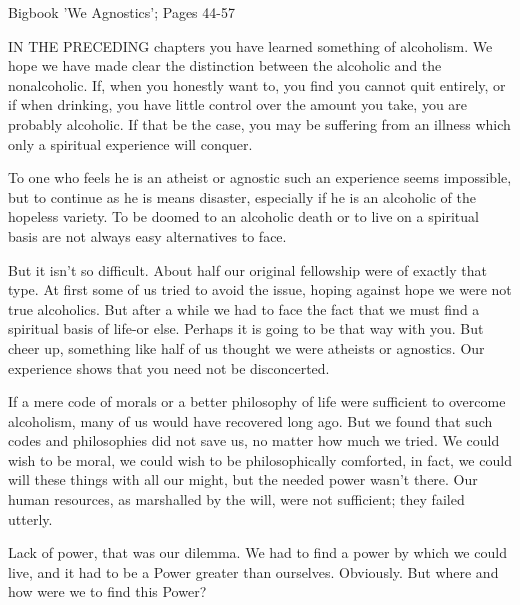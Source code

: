 

Bigbook 'We Agnostics'; Pages 44-57


\begin{biblechapter}
    IN THE PRECEDING chapters you have learned something of alcoholism. 
We hope we have made clear the distinction between the alcoholic and the nonalcoholic. 
If, when you honestly want to, you find you cannot quit entirely, 
or if when drinking, you have little control over the amount you take, 
you are probably alcoholic. 
If that be the case, you may be suffering from an illness which only a spiritual experience will conquer.

To one who feels he is an atheist or agnostic such an experience seems impossible, 
but to continue as he is means disaster, 
especially if he is an alcoholic of the hopeless variety. 
To be doomed to an alcoholic death or to live on a spiritual basis are not always easy alternatives to face.

But it isn't so difficult. 
About half our original fellowship were of exactly that type. 
At first some of us tried to avoid the issue, hoping against hope we were not true alcoholics. 
But after a while we had to face the fact that we must find a spiritual basis of life-or else. 
Perhaps it is going to be that way with you. 
But cheer up, something like half of us thought we were atheists or agnostics. 
Our experience shows that you need not be disconcerted.

If a mere code of morals or a better philosophy of life were sufficient to overcome alcoholism, 
many of us would have recovered long ago. 
But we found that such codes and philosophies did not save us, no matter how much we tried. 
We could wish to be moral, we could wish to be philosophically comforted, 
in fact, we could will these things with all our might, 
but the needed power wasn't there. 
Our human resources, as marshalled by the will, were not sufficient; 
they failed utterly.

Lack of power, that was our dilemma. 
We had to find a power by which we could live, and it had to be a Power greater than ourselves. 
Obviously. 
But where and how were we to find this Power?
\end{biblechapter}


